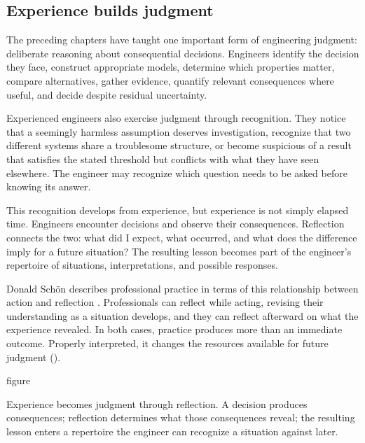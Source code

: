 \subsection{Experience builds judgment}\label{sec-experience-builds-judgment}

The preceding chapters have taught one important form of engineering judgment: deliberate reasoning
about consequential decisions. Engineers identify the decision they face, construct appropriate
models, determine which properties matter, compare alternatives, gather evidence, quantify relevant
consequences where useful, and decide despite residual uncertainty.

Experienced engineers also exercise judgment through recognition. They notice that a seemingly
harmless assumption deserves investigation, recognize that two different systems share a
troublesome structure, or become suspicious of a result that satisfies the stated threshold but
conflicts with what they have seen elsewhere. The engineer may recognize which question needs to be
asked before knowing its answer.

This recognition develops from experience, but experience is not simply elapsed time. Engineers
encounter decisions and observe their consequences. Reflection connects the two: what did I expect,
what occurred, and what does the difference imply for a future situation? The resulting lesson
becomes part of the engineer's repertoire of situations, interpretations, and possible responses.

Donald Schön describes professional practice in terms of this relationship between action and
reflection \citep{schon1983reflective}. Professionals can reflect while acting, revising their understanding as a
situation develops, and they can reflect afterward on what the experience revealed. In both cases,
practice produces more than an immediate outcome. Properly interpreted, it changes the resources
available for future judgment (\citet{fig-reflective-cycle}).

\begin{bookbox}{figure}{} %
\pandocbounded{}

Experience becomes judgment through reflection. A decision produces consequences; reflection
determines what those consequences reveal; the resulting lesson enters a repertoire the engineer
can recognize a situation against later.
\end{bookbox}


